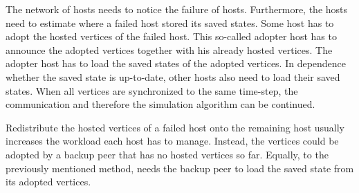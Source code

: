 The network of hosts needs to notice the failure of hosts.
Furthermore, the hosts need to estimate where a failed host stored its
saved states.  Some host has to adopt the hosted vertices of
the failed host.  This so-called adopter host has to announce the
adopted vertices together with his already hosted vertices.  The
adopter host has to load the saved states of the adopted
vertices. In dependence whether the saved state is up-to-date,
other hosts also need to load their saved states. When all
vertices are synchronized to the same time-step, the communication and
therefore the simulation algorithm can be continued.


Redistribute the hosted vertices of a failed host onto the remaining
host usually increases the workload each host has to manage.  Instead,
the vertices could be adopted by a backup peer that has no hosted
vertices so far.  Equally, to the previously mentioned method, needs
the backup peer to load the saved state from its adopted
vertices.

%


\cleardoublepage

